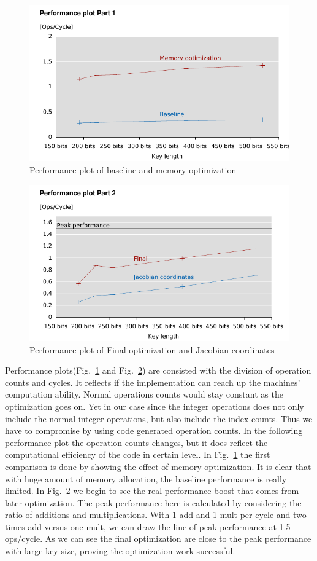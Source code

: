 \begin{figure}\centering
  \includegraphics[scale=0.7]{perfplot1}
  \caption{Performance plot of baseline and memory optimization\label{perfplot1}}
\end{figure}
\begin{figure}\centering
  \includegraphics[scale=0.7]{perfplot2}
  \caption{Performance plot of Final optimization and Jacobian coordinates\label{perfplot2}}
\end{figure}

Performance plots(Fig.~\ref{perfplot1} and Fig.~\ref{perfplot2}) are consisted with the division of operation counts and cycles. It reflects if the implementation can reach up the machines' computation ability. Normal operations counts would stay constant as the optimization goes on. Yet in our case since the integer operations does not only include the normal integer operations, but also include the index counts. Thus we have to compromise by using code generated operation counts. In the following performance plot the operation counts changes, but it does reflect the computational efficiency of the code in certain level. In Fig.~\ref{perfplot1} the first comparison is done by showing the effect of memory optimization. It is clear that with huge amount of memory allocation, the baseline performance is really limited. In Fig.~\ref{perfplot2} we begin to see the real performance boost that comes from later optimization. The peak performance here is calculated by considering the ratio of additions and multiplications. With 1 add and 1 mult per cycle and two times add versus one mult, we can draw the line of peak performance at 1.5 ops/cycle. As we can see the final optimization are close to the peak performance with large key size, proving the optimization work successful.


